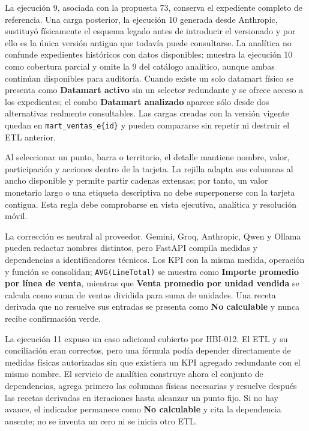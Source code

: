 \documentclass[11pt,letterpaper]{article}
\newcommand{\file}[1]{\texttt{#1}}
\begin{document}
La ejecución 9, asociada con la propuesta 73, conserva el expediente completo de referencia. Una carga posterior, la ejecución 10 generada desde Anthropic, sustituyó físicamente el esquema legado antes de introducir el versionado y por ello es la única versión antigua que todavía puede consultarse. La analítica no confunde expedientes históricos con datos disponibles: muestra la ejecución 10 como cobertura parcial y omite la 9 del catálogo analítico, aunque ambas continúan disponibles para auditoría. Cuando existe un solo datamart físico se presenta como \textbf{Datamart activo} sin un selector redundante y se ofrece acceso a los expedientes; el combo \textbf{Datamart analizado} aparece sólo desde dos alternativas realmente consultables. Las cargas creadas con la versión vigente quedan en \file{mart\_ventas\_e\{id\}} y pueden compararse sin repetir ni destruir el ETL anterior.

Al seleccionar un punto, barra o territorio, el detalle mantiene nombre, valor, participación y acciones dentro de la tarjeta. La rejilla adapta sus columnas al ancho disponible y permite partir cadenas extensas; por tanto, un valor monetario largo o una etiqueta descriptiva no debe superponerse con la tarjeta contigua. Esta regla debe comprobarse en vista ejecutiva, analítica y resolución móvil.

La corrección es neutral al proveedor. Gemini, Groq, Anthropic, Qwen y Ollama pueden redactar nombres distintos, pero FastAPI compila medidas y dependencias a identificadores técnicos. Los KPI con la misma medida, operación y función se consolidan; \file{AVG(LineTotal)} se muestra como \textbf{Importe promedio por línea de venta}, mientras que \textbf{Venta promedio por unidad vendida} se calcula como suma de ventas dividida para suma de unidades. Una receta derivada que no resuelve sus entradas se presenta como \textbf{No calculable} y nunca recibe confirmación verde.

La ejecución 11 expuso un caso adicional cubierto por HBI-012. El ETL y su conciliación eran correctos, pero una fórmula podía depender directamente de medidas físicas autorizadas sin que existiera un KPI agregado redundante con el mismo nombre. El servicio de analítica construye ahora el conjunto de dependencias, agrega primero las columnas físicas necesarias y resuelve después las recetas derivadas en iteraciones hasta alcanzar un punto fijo. Si no hay avance, el indicador permanece como \textbf{No calculable} y cita la dependencia ausente; no se inventa un cero ni se inicia otro ETL.
\end{document}
